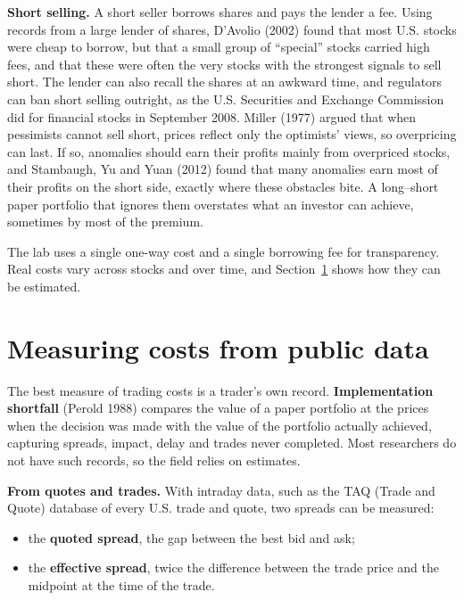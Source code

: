 \textbf{Short selling.} A short seller borrows shares and pays the lender a fee. Using records from a large lender of shares, D'Avolio (2002) found that most U.S. stocks were cheap to borrow, but that a small group of ``special'' stocks carried high fees, and that these were often the very stocks with the strongest signals to sell short. The lender can also recall the shares at an awkward time, and regulators can ban short selling outright, as the U.S. Securities and Exchange Commission did for financial stocks in September 2008. Miller (1977) argued that when pessimists cannot sell short, prices reflect only the optimists' views, so overpricing can last. If so, anomalies should earn their profits mainly from overpriced stocks, and Stambaugh, Yu and Yuan (2012) found that many anomalies earn most of their profits on the short side, exactly where these obstacles bite. A long--short paper portfolio that ignores them overstates what an investor can achieve, sometimes by most of the premium.

The lab uses a single one-way cost and a single borrowing fee for transparency. Real costs vary across stocks and over time, and Section~\ref{sec:17-measuring} shows how they can be estimated.


\section{Measuring costs from public data}
\label{sec:17-measuring}

The best measure of trading costs is a trader's own record. \textbf{Implementation shortfall} (Perold 1988) compares the value of a paper portfolio at the prices when the decision was made with the value of the portfolio actually achieved, capturing spreads, impact, delay and trades never completed. Most researchers do not have such records, so the field relies on estimates.

\textbf{From quotes and trades.} With intraday data, such as the TAQ (Trade and Quote) database of every U.S. trade and quote, two spreads can be measured:

\begin{itemize}
  \item the \textbf{quoted spread}, the gap between the best bid and ask;
  \item the \textbf{effective spread}, twice the difference between the trade price and the midpoint at the time of the trade.
\end{itemize}

